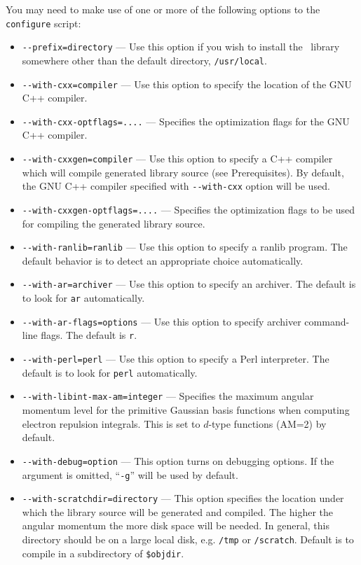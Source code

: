 \documentclass[12pt]{article}
\begin{document}
\noindent
You may need to make use of one or more of the following options to
the {\tt configure} script:
\begin{itemize}
\item {\tt -}{\tt -prefix=directory} --- Use this option if you wish to
  install the \LIBINT\ library somewhere other than the default
  directory, {\tt /usr/local}.
\item {\tt -}{\tt -with-cxx=compiler} --- Use this option to specify the location
  of the GNU C++
  compiler.
\item {\tt -}{\tt -with-cxx-optflags=....} --- Specifies the optimization flags for
  the GNU C++ compiler.
\item {\tt -}{\tt -with-cxxgen=compiler} --- Use this option to specify a C++ compiler
  which will compile generated library source (see Prerequisites). By default, the GNU C++
  compiler specified with {\tt -}{\tt -with-cxx} option will be used.
\item {\tt -}{\tt -with-cxxgen-optflags=....} --- Specifies the optimization flags to be
  used for compiling the generated library source. 
\item {\tt -}{\tt -with-ranlib=ranlib} --- Use this option to specify
  a ranlib program. The default behavior is to detect an appropriate
  choice automatically.
\item {\tt -}{\tt -with-ar=archiver} --- Use this option to specify an
  archiver.  The default is to look for {\tt ar} automatically.
\item {\tt -}{\tt -with-ar-flags=options} --- Use this option to specify
  archiver command-line flags. The default is {\tt r}.
\item {\tt -}{\tt -with-perl=perl} --- Use this option to specify a
  Perl interpreter.  The default is to look for {\tt perl} automatically.
\item {\tt -}{\tt -with-libint-max-am=integer} --- Specifies the maximum
  angular momentum level for the primitive Gaussian basis functions
  when computing electron repulsion integrals.  This is set to
  $d$-type functions (AM=2) by default.
\item {\tt -}{\tt -with-debug=option} --- This option turns on debugging
  options.  If the argument is omitted, ``{\tt -g}'' will be used by default.
\item {\tt -}{\tt -with-scratchdir=directory} --- This option specifies the location
  under which the library source will be generated and compiled. The higher the angular
  momentum the more disk space will be needed. In general, this directory should be
  on a large local disk, e.g. {\tt /tmp} or {\tt /scratch}. Default is to compile
  in a subdirectory of {\tt \$objdir}.
\end{itemize}
\end{document}
